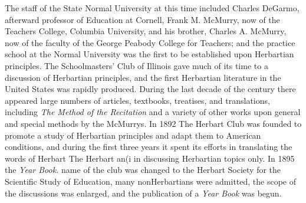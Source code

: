 \documentclass[
]{book}
\begin{document}
The staff of the State Normal University at this time included Charles DeGarmo, afterward professor of Education at Cornell, Frank M. McMurry, now of the Teachers College, Columbia University, and his brother, Charles A. McMurry, now of the faculty of the George Peabody College for Teachers; and the practice school at the Normal University was the first to be established upon Herbartian principles. The Schoolmasters' Club of Illinois gave much of its time to a discussion of Herbartian principles, and the first Herbartian literature in the United States was rapidly produced. During the last decade of the century there appeared large numbers of articles, textbooks, treatises, and translations, including \emph{The Method of the Recitation} and a variety of other works upon general and special methods by the McMurrys. In 1892 The Herbart Club was founded to promote a study of Herbartian principles and adapt them to American conditions, and during the first three years it spent its efforts in translating the words of Herbart The Herbart an(i in discussing Herbartian topics only. In 1895 the \emph{Year Book.} name of the club was changed to the Herbart Society for the Scientific Study of Education, many nonHerbartians were admitted, the scope of the discussions was enlarged, and the publication of a \emph{Year Book} was begun.
\end{document}
